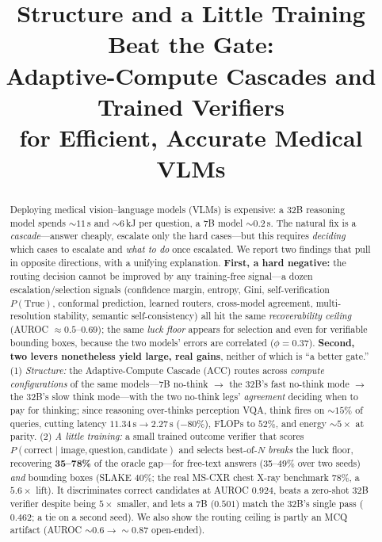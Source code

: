 \documentclass[conference]{IEEEtran}
\title{Structure and a Little Training Beat the Gate:\\Adaptive-Compute Cascades and Trained Verifiers\\for Efficient, Accurate Medical VLMs}
\author{\IEEEauthorblockN{Li-Wen Kuan (Leo) \textit{et al.}}
\IEEEauthorblockA{CVGIP 2026 (draft) \\ \textit{All numbers are from real checkpoints; none fabricated.}}}
\begin{document}
\maketitle

\begin{abstract}
Deploying medical vision--language models (VLMs) is expensive: a 32B reasoning model spends ${\sim}11$\,s and ${\sim}6$\,kJ per question, a 7B model ${\sim}0.2$\,s. The natural fix is a \emph{cascade}---answer cheaply, escalate only the hard cases---but this requires \emph{deciding} which cases to escalate and \emph{what to do} once escalated. We report two findings that pull in opposite directions, with a unifying explanation. \textbf{First, a hard negative:} the routing decision cannot be improved by any training-free signal---a dozen escalation/selection signals (confidence margin, entropy, Gini, self-verification $P(\text{True})$, conformal prediction, learned routers, cross-model agreement, multi-resolution stability, semantic self-consistency) all hit the same \emph{recoverability ceiling} (AUROC ${\approx}0.5$--$0.69$); the same \emph{luck floor} appears for selection and even for verifiable bounding boxes, because the two models' errors are correlated ($\phi{=}0.37$). \textbf{Second, two levers nonetheless yield large, real gains}, neither of which is ``a better gate.'' (1) \emph{Structure:} the Adaptive-Compute Cascade (ACC) routes across \emph{compute configurations} of the same models---7B no-think $\to$ the 32B's fast no-think mode $\to$ the 32B's slow think mode---with the two no-think legs' \emph{agreement} deciding when to pay for thinking; since reasoning over-thinks perception VQA, think fires on ${\sim}15\%$ of queries, cutting latency $11.34\,\mathrm{s}{\to}2.27\,\mathrm{s}$ ($-80\%$), FLOPs to $52\%$, and energy ${\sim}5\times$ at parity. (2) \emph{A little training:} a small trained outcome verifier that scores $P(\text{correct}\mid \text{image},\text{question},\text{candidate})$ and selects best-of-$N$ \emph{breaks} the luck floor, recovering \textbf{35--78\%} of the oracle gap---for free-text answers (35--49\% over two seeds) \emph{and} bounding boxes (SLAKE 40\%; the real MS-CXR chest X-ray benchmark 78\%, a $5.6\times$ lift). It discriminates correct candidates at AUROC $0.924$, beats a zero-shot 32B verifier despite being $5\times$ smaller, and lets a 7B ($0.501$) match the 32B's single pass ($0.462$; a tie on a second seed). We also show the routing ceiling is partly an MCQ artifact (AUROC ${\sim}0.6{\to}{\sim}0.87$ open-ended).
\end{abstract}
\end{document}
